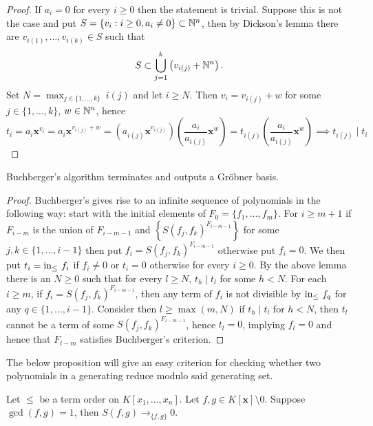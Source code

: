 \begin{proof}
    If $a_i=0$ for every $i\geq 0$ then the statement is trivial. Suppose this is not the case and put $S= \{v_i  :  i\geq 0, a_i\neq 0\}\subset \mathbb{N}^n$, then by Dickson's lemma there are $v_{i(1)},\dots,v_{i(k)}\in S$ such that 
    $$S\subset\bigcup_{j=1}^k \left(v_{i(j)}+\mathbb{N}^n\right).$$
    Set $N= \max_{j\in\{1,\dots,k\}}\ i(j)$ and let $i\geq N$. Then $v_i = v_{i(j)}+w$ for some $j\in\{1,\dots,k\}$, $w\in \mathbb{N}^n$, hence 
    $$t_i = a_i\mathbf{x}^{v_i} = a_{i}\mathbf{x}^{v_{i(j)}+w} = \left(a_{i(j)}\mathbf{x}^{v_{i(j)}}\right)\left(\frac{a_i}{a_{i(j)}}\mathbf{x}^{w}\right) = t_{i(j)}\left(\frac{a_i}{a_{i(j)}}\mathbf{x}^{w}\right) \implies t_{i(j)}\mid t_i$$
\end{proof}
\begin{theorem}
    Buchberger's algorithm terminates and outputs a Gröbner basis. 
\end{theorem}
\begin{proof}
    Buchberger's gives rise to an infinite sequence of polynomials in the following way: start with the initial elements of  $F_0=\{f_1,\dots,f_m\}$. For $i\geq m+1$ if $F_{i-m}$ is the union of $F_{i-m-1}$ and $\left\{S(f_j,f_k)^{F_{i-m-1}}\right\}$ for some $j,k\in\{1,\dots,i-1\}$ then put $f_i = S(f_j,f_k)^{F_{i-m-1}}$ otherwise put $f_i = 0$. We then put $t_i = \mathrm{in}_\leq\ f_i$ if $f_i \neq 0$ or $t_i = 0$ otherwise for every $i\geq 0$. By the above lemma there is an $N\geq 0$ such that for every $l\geq N$, $t_h\mid t_l$ for some $h<N$. For each $i\geq m$, if $f_i = S(f_j,f_k)^{F_{i-m-1}}$, then any term of $f_i$ is not divisible by $\mathrm{in}_\leq\ f_q$ for any $q\in\{1,\dots,i-1\}$. Consider then $l\geq \max(m,N)$ if $t_h \mid t_l$ for $h<N$, then $t_l$ cannot be a term of some $S(f_j,f_k)^{F_{l-m-1}}$, hence $t_l = 0$, implying $f_l =0$ and hence that $F_{l-m}$ satisfies Buchberger's criterion.     
\end{proof}
The below proposition will give an easy criterion for checking whether two polynomials in a generating reduce modulo said generating set. 
\begin{proposition}\label{SufficientToCheckInitialTermsCoPrime}
    Let $\leq$ be a term order on $K[x_1,\dots,x_n]$. Let $f,g\in K[\mathbf{x}]\setminus0$. Suppose $\gcd(f,g) = 1$, then $S(f,g)\to_{\{f,g\}} 0$.
\end{proposition}
